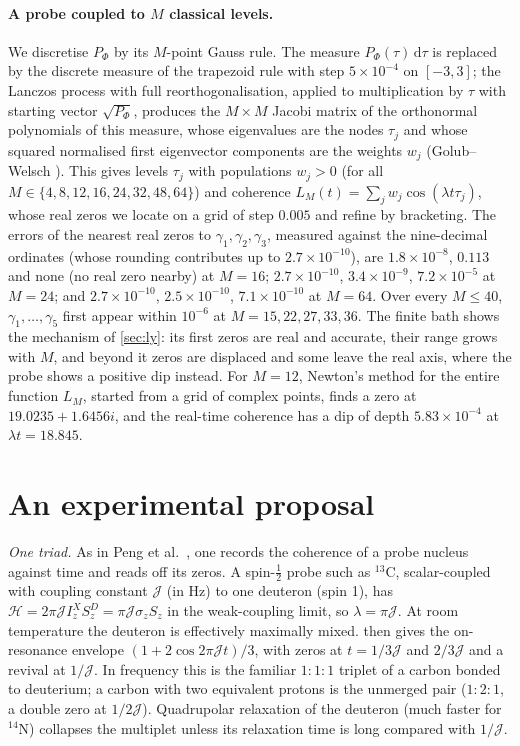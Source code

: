 \documentclass[11pt]{article}
\theoremstyle{definition}\newtheorem{definition}[theorem]{Definition}
\theoremstyle{remark}\newtheorem{remark}[theorem]{Remark}
\newcommand{\dd}{\,\mathrm d}\newcommand{\e}{\mathrm e}
\begin{document}
\paragraph{A probe coupled to $M$ classical levels.} We discretise $P_\Phi$ by its $M$-point Gauss rule. The measure $P_\Phi(\tau)\dd\tau$ is replaced by the discrete measure of the trapezoid rule with step $5\times10^{-4}$ on $[-3,3]$; the Lanczos process with full reorthogonalisation, applied to multiplication by $\tau$ with starting vector $\sqrt{P_\Phi}$, produces the $M\times M$ Jacobi matrix of the orthonormal polynomials of this measure, whose eigenvalues are the nodes $\tau_j$ and whose squared normalised first eigenvector components are the weights $w_j$ (Golub--Welsch \cite{GolubWelsch}). This gives levels $\tau_j$ with populations $w_j>0$ (for all $M\in\{4,8,12,16,24,32,48,64\}$) and coherence $L_M(t)=\sum_jw_j\cos(\lambda t\tau_j)$, whose real zeros we locate on a grid of step $0.005$ and refine by bracketing. The errors of the nearest real zeros to $\gamma_1,\gamma_2,\gamma_3$, measured against the nine-decimal ordinates (whose rounding contributes up to $2.7\times10^{-10}$), are $1.8\times10^{-8}$, $0.113$ and none (no real zero nearby) at $M=16$; $2.7\times10^{-10}$, $3.4\times10^{-9}$, $7.2\times10^{-5}$ at $M=24$; and $2.7\times10^{-10}$, $2.5\times10^{-10}$, $7.1\times10^{-10}$ at $M=64$. Over every $M\le40$, $\gamma_1,\dots,\gamma_5$ first appear within $10^{-6}$ at $M=15,22,27,33,36$. The finite bath shows the mechanism of \cref{sec:ly}: its first zeros are real and accurate, their range grows with $M$, and beyond it zeros are displaced and some leave the real axis, where the probe shows a positive dip instead. For $M=12$, Newton's method for the entire function $L_M$, started from a grid of complex points, finds a zero at $19.0235+1.6456i$, and the real-time coherence has a dip of depth $5.83\times10^{-4}$ at $\lambda t=18.845$.

\section{An experimental proposal}\label{sec:exp}
\emph{One triad.} As in Peng et al.\ \cite{Peng}, one records the coherence of a probe nucleus against time and reads off its zeros. A spin-$\frac12$ probe such as $^{13}$C, scalar-coupled with coupling constant $\mathcal J$ (in Hz) to one deuteron (spin 1), has $\mathcal H=2\pi\mathcal JI_z^XS_z^D=\pi\mathcal J\sigma_zS_z$ in the weak-coupling limit, so $\lambda=\pi\mathcal J$. At room temperature the deuteron is effectively maximally mixed.  then gives the on-resonance envelope $(1+2\cos2\pi\mathcal Jt)/3$, with zeros at $t=1/3\mathcal J$ and $2/3\mathcal J$ and a revival at $1/\mathcal J$. In frequency this is the familiar $1{:}1{:}1$ triplet of a carbon bonded to deuterium; a carbon with two equivalent protons is the unmerged pair ($1{:}2{:}1$, a double zero at $1/2\mathcal J$). Quadrupolar relaxation of the deuteron (much faster for $^{14}$N) collapses the multiplet unless its relaxation time is long compared with $1/\mathcal J$.
\end{document}
